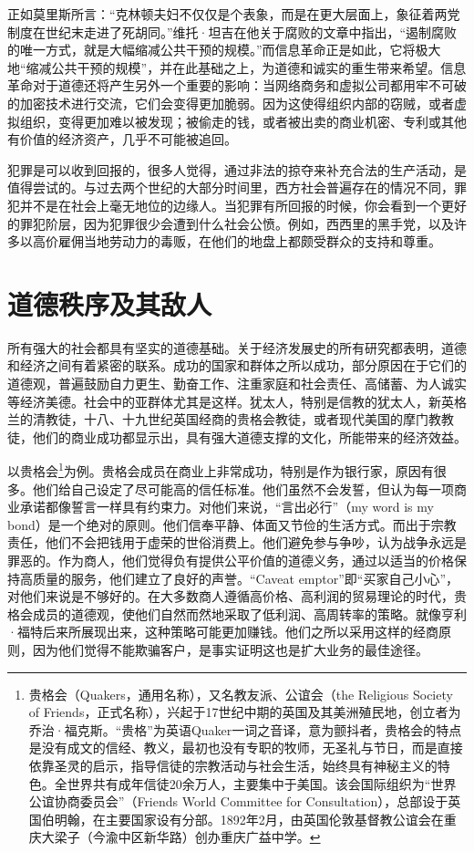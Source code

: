 正如莫里斯所言：“克林顿夫妇不仅仅是个表象，而是在更大层面上，象征着两党制度在世纪末走进了死胡同。”维托·坦吉在他关于腐败的文章中指出，“遏制腐败的唯一方式，就是大幅缩减公共干预的规模。”而信息革命正是如此，它将极大地“缩减公共干预的规模”，并在此基础之上，为道德和诚实的重生带来希望。信息革命对于道德还将产生另外一个重要的影响：当网络商务和虚拟公司都用牢不可破的加密技术进行交流，它们会变得更加脆弱。因为这使得组织内部的窃贼，或者虚拟组织，变得更加难以被发现；被偷走的钱，或者被出卖的商业机密、专利或其他有价值的经济资产，几乎不可能被追回。

犯罪是可以收到回报的，很多人觉得，通过非法的掠夺来补充合法的生产活动，是值得尝试的。与过去两个世纪的大部分时间里，西方社会普遍存在的情况不同，罪犯并不是在社会上毫无地位的边缘人。当犯罪有所回报的时候，你会看到一个更好的罪犯阶层，因为犯罪很少会遭到什么社会公愤。例如，西西里的黑手党，以及许多以高价雇佣当地劳动力的毒贩，在他们的地盘上都颇受群众的支持和尊重。

\section{道德秩序及其敌人}
所有强大的社会都具有坚实的道德基础。关于经济发展史的所有研究都表明，道德和经济之间有着紧密的联系。成功的国家和群体之所以成功，部分原因在于它们的道德观，普遍鼓励自力更生、勤奋工作、注重家庭和社会责任、高储蓄、为人诚实等经济美德。社会中的亚群体尤其是这样。犹太人，特别是信教的犹太人，新英格兰的清教徒，十八、十九世纪英国经商的贵格会教徒，或者现代美国的摩门教教徒，他们的商业成功都显示出，具有强大道德支撑的文化，所能带来的经济效益。

以贵格会\footnote{贵格会（Quakers，通用名称），又名教友派、公谊会（the Religious Society of Friends，正式名称），兴起于17世纪中期的英国及其美洲殖民地，创立者为乔治·福克斯。“贵格”为英语Quaker一词之音译，意为颤抖者，贵格会的特点是没有成文的信经、教义，最初也没有专职的牧师，无圣礼与节日，而是直接依靠圣灵的启示，指导信徒的宗教活动与社会生活，始终具有神秘主义的特色。全世界共有成年信徒20余万人，主要集中于美国。该会国际组织为“世界公谊协商委员会”（Friends World Committee for Consultation），总部设于英国伯明翰，在主要国家设有分部。1892年2月，由英国伦敦基督教公谊会在重庆大梁子（今渝中区新华路）创办重庆广益中学。}为例。贵格会成员在商业上非常成功，特别是作为银行家，原因有很多。他们给自己设定了尽可能高的信任标准。他们虽然不会发誓，但认为每一项商业承诺都像誓言一样具有约束力。对他们来说，“言出必行”（my word is my bond）是一个绝对的原则。他们信奉平静、体面又节俭的生活方式。而出于宗教责任，他们不会把钱用于虚荣的世俗消费上。他们避免参与争吵，认为战争永远是罪恶的。作为商人，他们觉得负有提供公平价值的道德义务，通过以适当的价格保持高质量的服务，他们建立了良好的声誉。“Caveat emptor”即“买家自己小心”，对他们来说是不够好的。在大多数商人遵循高价格、高利润的贸易理论的时代，贵格会成员的道德观，使他们自然而然地采取了低利润、高周转率的策略。就像亨利·福特后来所展现出来，这种策略可能更加赚钱。他们之所以采用这样的经商原则，因为他们觉得不能欺骗客户，是事实证明这也是扩大业务的最佳途径。


